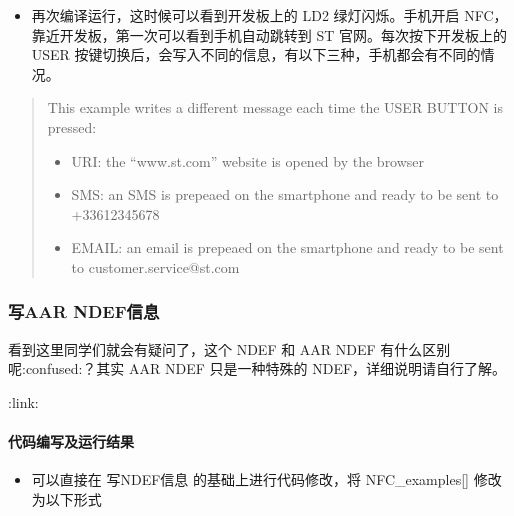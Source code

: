 \documentclass[a4paper,12pt,english]{sphinxmanual}
\begin{document}
\sphinxAtStartPar
{}

\sphinxAtStartPar
{}
\begin{itemize}
\item {} 
\sphinxAtStartPar
再次编译运行，这时候可以看到开发板上的 LD2 绿灯闪烁。手机开启 NFC，靠近开发板，第一次可以看到手机自动跳转到 ST 官网。每次按下开发板上的 USER 按键切换后，会写入不同的信息，有以下三种，手机都会有不同的情况。

\end{itemize}
\begin{quote}

\sphinxAtStartPar
This example writes a different message each time the USER BUTTON is pressed:
\begin{itemize}
\item {} 
\sphinxAtStartPar
URI:    the “www.st.com” website is opened by the browser

\item {} 
\sphinxAtStartPar
SMS:    an SMS is prepeaed on the smartphone and ready to be sent to +33612345678

\item {} 
\sphinxAtStartPar
EMAIL:  an email is prepeaed on the smartphone and ready to be sent to customer.service@st.com

\end{itemize}
\end{quote}




\subsubsection{写AAR NDEF信息}
\label{\detokenize{exp-stm32/nfc:aar-ndef}}
\sphinxAtStartPar
看到这里同学们就会有疑问了，这个 NDEF 和 AAR NDEF 有什么区别呢:confused:？其实 AAR NDEF 只是一种特殊的 NDEF，详细说明请自行了解。

\sphinxAtStartPar
:link:


\paragraph{代码编写及运行结果}
\label{\detokenize{exp-stm32/nfc:id8}}\begin{itemize}
\item {} 
\sphinxAtStartPar
可以直接在 写NDEF信息 的基础上进行代码修改，将 NFC\_examples{[}{]} 修改为以下形式

\end{itemize}
\end{document}

